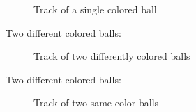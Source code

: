 \documentclass{sciposter}
\begin{document}
\begin{multicols}{3}
\begin{figure}[!h]
	\centering
			\setlength{\fboxsep}{1pt}
			\setlength{\fboxrule}{1pt}
	\caption{Track of a single colored ball}
	\label{fig:single_color}
\end{figure}

Two different colored balls:

\begin{figure}[!h]
	\centering
			\setlength{\fboxsep}{1pt}
			\setlength{\fboxrule}{1pt}
	\caption{Track of two differently colored balls}
	\label{fig:two_diff}
\end{figure}

Two different colored balls:

\begin{figure}[!h]
	\centering
			\setlength{\fboxsep}{1pt}
			\setlength{\fboxrule}{1pt}
	\caption{Track of two same color balls}
	\label{fig:two_same}
\end{figure}


\end{multicols}
\end{document}
